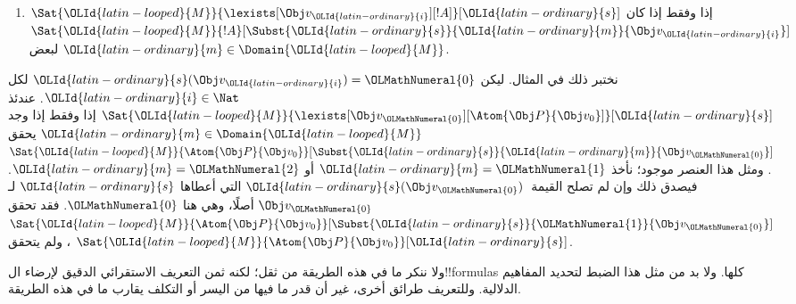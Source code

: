 \documentclass[../../../include/open-logic-section]{subfiles}
\begin{document}
\begin{enumerate}
  \item $\Sat{\OLId{latin-looped}{M}}{\lexists[\Obj v_\OLId{latin-ordinary}{i}][!A]}[\OLId{latin-ordinary}{s}]$ إذا وفقط إذا كان
  $\Sat{\OLId{latin-looped}{M}}{!A}[\Subst{\OLId{latin-ordinary}{s}}{\OLId{latin-ordinary}{m}}{\Obj v_\OLId{latin-ordinary}{i}}]$ لبعض
  $\OLId{latin-ordinary}{m} \in \Domain{\OLId{latin-looped}{M}}$.
\end{enumerate}
نختبر ذلك في المثال. ليكن $\OLId{latin-ordinary}{s}(\Obj v_\OLId{latin-ordinary}{i}) = \OLMathNumeral{0}$ لكل
$\OLId{latin-ordinary}{i} \in \Nat$. عندئذ
$\Sat{\OLId{latin-looped}{M}}{\lexists[\Obj v_\OLMathNumeral{0}][\Atom{\Obj P}{\Obj v_0}]}[\OLId{latin-ordinary}{s}]$
إذا وفقط إذا وجد $\OLId{latin-ordinary}{m} \in \Domain{\OLId{latin-looped}{M}}$ يحقق
$\Sat{\OLId{latin-looped}{M}}{\Atom{\Obj P}{\Obj v_0}}[\Subst{\OLId{latin-ordinary}{s}}{\OLId{latin-ordinary}{m}}{\Obj v_\OLMathNumeral{0}}]$.
ومثل هذا العنصر موجود؛ نأخذ $\OLId{latin-ordinary}{m} = \OLMathNumeral{1}$ أو $\OLId{latin-ordinary}{m} = \OLMathNumeral{2}$.
فيصدق ذلك وإن لم تصلح القيمة~$\OLId{latin-ordinary}{s}(\Obj v_\OLMathNumeral{0})$ التي أعطاها $\OLId{latin-ordinary}{s}$
لـ$\Obj v_\OLMathNumeral{0}$ أصلًا، وهي هنا $\OLMathNumeral{0}$. فقد تحقق
$\Sat{\OLId{latin-looped}{M}}{\Atom{\Obj P}{\Obj v_0}}[\Subst{\OLId{latin-ordinary}{s}}{\OLMathNumeral{1}}{\Obj v_\OLMathNumeral{0}}]$،
ولم يتحقق $\Sat{\OLId{latin-looped}{M}}{\Atom{\Obj P}{\Obj v_0}}[\OLId{latin-ordinary}{s}]$.

ولا ننكر ما في هذه الطريقة من ثقل؛ لكنه ثمن التعريف الاستقرائي
الدقيق لإرضاء ال!!{formula}s كلها. ولا بد من مثل هذا الضبط
لتحديد المفاهيم الدلالية. وللتعريف طرائق أخرى، غير أن قدر ما فيها
من اليسر أو التكلف يقارب ما في هذه الطريقة.
\end{document}
